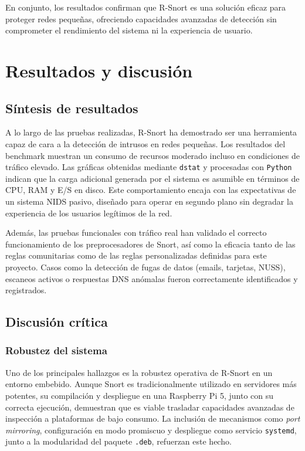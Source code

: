 \documentclass[11pt,a4paper,twoside]{report}
\begin{document}
En conjunto, los resultados confirman que R-Snort es una solución eficaz para proteger redes pequeñas, ofreciendo capacidades avanzadas de detección sin comprometer el rendimiento del sistema ni la experiencia de usuario.


\chapter{Resultados y discusión}

\section{Síntesis de resultados}

A lo largo de las pruebas realizadas, R-Snort ha demostrado ser una herramienta capaz de cara a la detección de intrusos en redes pequeñas. Los resultados del benchmark muestran un consumo de recursos moderado incluso en condiciones de tráfico elevado. Las gráficas obtenidas mediante \texttt{dstat} y procesadas con \texttt{Python} indican que la carga adicional generada por el sistema es asumible en términos de CPU, RAM y E/S en disco. Este comportamiento encaja con las expectativas de un sistema NIDS pasivo, diseñado para operar en segundo plano sin degradar la experiencia de los usuarios legítimos de la red.\newline

Además, las pruebas funcionales con tráfico real han validado el correcto funcionamiento de los preprocesadores de Snort, así como la eficacia tanto de las reglas comunitarias como de las reglas personalizadas definidas para este proyecto. Casos como la detección de fugas de datos (emails, tarjetas, NUSS), escaneos activos o respuestas DNS anómalas fueron correctamente identificados y registrados.

\section{Discusión crítica}

\subsection*{Robustez del sistema}

Uno de los principales hallazgos es la robustez operativa de R-Snort en un entorno embebido. Aunque Snort es tradicionalmente utilizado en servidores más potentes, su compilación y despliegue en una Raspberry Pi 5, junto con su correcta ejecución, demuestran que es viable trasladar capacidades avanzadas de inspección a plataformas de bajo consumo. La inclusión de mecanismos como \textit{port mirroring}, configuración en modo promiscuo y despliegue como servicio \texttt{systemd}, junto a la modularidad del paquete \texttt{.deb}, refuerzan este hecho.
\end{document}
